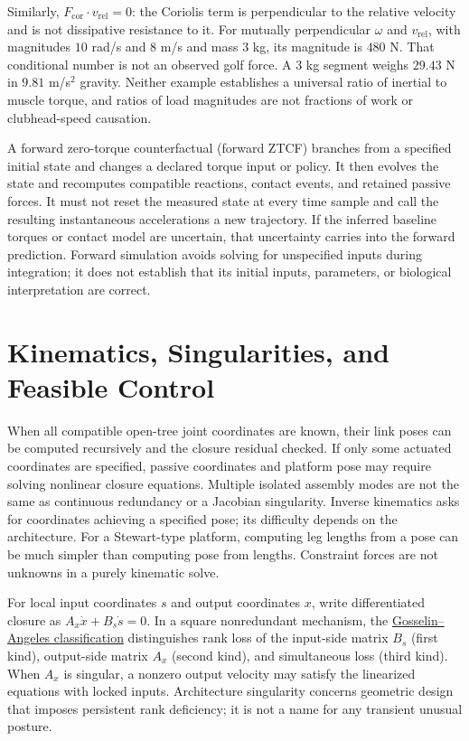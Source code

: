 Similarly, $F_{\mathrm{cor}}\cdot v_{\mathrm{rel}}=0$: the Coriolis term is
perpendicular to the relative velocity and is not dissipative resistance to it.
For mutually perpendicular $\omega$ and $v_{\mathrm{rel}}$, with magnitudes
$10$ rad/s and $8$ m/s and mass $3$ kg, its magnitude is $480$ N. That conditional
number is not an observed golf force. A $3$ kg segment weighs $29.43$ N in
$9.81$ m/s$^2$ gravity. Neither example establishes a universal ratio of inertial
to muscle torque, and ratios of load magnitudes are not fractions of work or
clubhead-speed causation.

A forward zero-torque counterfactual (forward ZTCF) branches from a specified
initial state and changes a declared torque input or policy. It then evolves
the state and recomputes compatible reactions, contact events, and retained
passive forces. It must not reset the measured state at every time sample and
call the resulting instantaneous accelerations a new trajectory. If the inferred
baseline torques or contact model are uncertain, that uncertainty carries into
the forward prediction. Forward simulation avoids solving for unspecified
inputs during integration; it does not establish that its initial inputs,
parameters, or biological interpretation are correct.

\section{Kinematics, Singularities, and Feasible Control}
\label{sec:singularities_parallel}

When all compatible open-tree joint coordinates are known, their link poses can
be computed recursively and the closure residual checked. If only some actuated
coordinates are specified, passive coordinates and platform pose may require
solving nonlinear closure equations. Multiple isolated assembly modes are not
the same as continuous redundancy or a Jacobian singularity. Inverse kinematics
asks for coordinates achieving a specified pose; its difficulty depends on the
architecture. For a Stewart-type platform, computing leg lengths from a pose
can be much simpler than computing pose from lengths. Constraint forces are not
unknowns in a purely kinematic solve.

For local input coordinates $s$ and output coordinates $x$, write differentiated
closure as $A_x\dot x+B_s\dot s=0$. In a square nonredundant mechanism, the
\href{https://doi.org/10.1109/70.56660}{Gosselin--Angeles classification}
distinguishes rank loss of the input-side matrix $B_s$ (first kind), output-side
matrix $A_x$ (second kind), and simultaneous loss (third kind). When $A_x$ is
singular, a nonzero output velocity may satisfy the linearized equations with
locked inputs. Architecture singularity concerns geometric design that imposes
persistent rank deficiency; it is not a name for any transient unusual posture.

